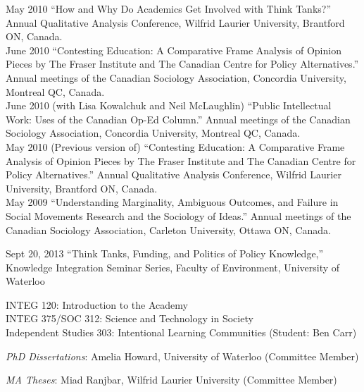 \documentclass[11pt,usenames,dvipsnames]{article}
\begin{document}
\ind May 2010 ``How and Why Do Academics Get Involved with Think Tanks?'' Annual Qualitative Analysis Conference, Wilfrid Laurier University, Brantford ON, Canada.\\

\ind June 2010 ``Contesting Education: A Comparative Frame Analysis of Opinion Pieces by The Fraser Institute and The Canadian Centre for Policy Alternatives.'' Annual meetings  of the Canadian Sociology Association, Concordia University, Montreal QC, Canada.\\

\ind June 2010 (with Lisa Kowalchuk and Neil McLaughlin) ``Public Intellectual Work: Uses of the Canadian Op-Ed Column.'' Annual meetings of the Canadian Sociology Association, Concordia University, Montreal QC, Canada.\\

\ind May 2010 (Previous version of) ``Contesting Education: A Comparative Frame Analysis of Opinion Pieces by The Fraser Institute and The Canadian Centre for Policy Alternatives.'' Annual Qualitative Analysis Conference, Wilfrid Laurier University, Brantford ON, Canada.\\

\ind May 2009 ``Understanding Marginality, Ambiguous Outcomes, and Failure in Social Movements Research and the Sociology of Ideas.'' Annual meetings of the Canadian Sociology Association, Carleton University, Ottawa ON, Canada.\\


\ind Sept 20, 2013 ``Think Tanks, Funding, and Politics of Policy Knowledge,'' Knowledge Integration Seminar Series, Faculty of Environment, University of Waterloo \\


\noindent INTEG 120: Introduction to the Academy \\
\noindent INTEG 375/SOC 312: Science and Technology in Society \\
\noindent Independent Studies 303: Intentional Learning Communities (Student: Ben Carr) \\


\noindent \emph{PhD Dissertations}: Amelia Howard, University of Waterloo (Committee Member)    

\noindent \emph{MA Theses}: Miad Ranjbar, Wilfrid Laurier University (Committee Member)
\end{document}
